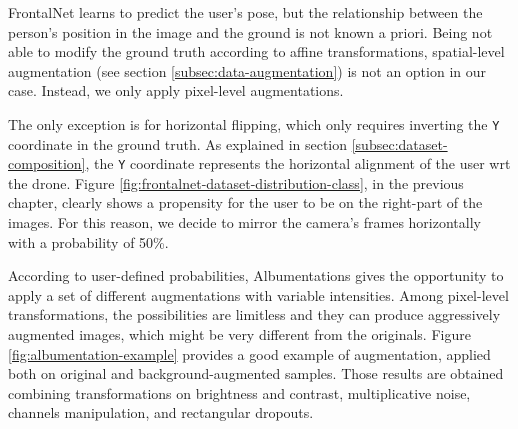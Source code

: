 \medskip

FrontalNet learns to predict the user's pose, but the relationship between the person's position in the image and the ground is not known a priori. Being not able to modify the ground truth according to affine transformations, spatial-level augmentation (see section \ref{subsec:data-augmentation}) is not an option in our case. Instead, we only apply pixel-level augmentations. 

The only exception is for horizontal flipping, which only requires inverting the \texttt{Y} coordinate in the ground truth. As explained in section \ref{subsec:dataset-composition}, the \texttt{Y} coordinate represents the horizontal alignment of the user \gls{wrt} the drone. Figure \ref{fig:frontalnet-dataset-distribution-class}, in the previous chapter, clearly shows a propensity for the user to be on the right-part of the images. For this reason, we decide to mirror the camera's frames horizontally with a probability of 50\%.

\medskip

According to user-defined probabilities, Albumentations gives the opportunity to apply a set of different augmentations with variable intensities. Among pixel-level transformations, the possibilities are limitless and they can produce aggressively augmented images, which might be very different from the originals. Figure \ref{fig:albumentation-example} provides a good example of augmentation, applied both on original and background-augmented samples. Those results are obtained combining transformations on brightness and contrast, multiplicative noise, channels manipulation, and rectangular dropouts.

